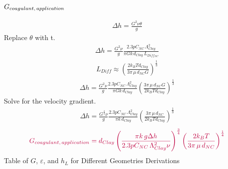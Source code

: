 \documentclass[letterpaper,10pt,english]{sphinxmanual}
\begin{document}
\subsubsection{\protect\(G_{coagulant, \, application}\protect\)}
\label{\detokenize{Rapid_Mix/RM_Derivations:id1}}\begin{equation}\label{equation:Rapid_Mix/RM_Derivations:Rapid_Mix/RM_Derivations:14}
\begin{split}\Delta h =   \frac{G^2 \nu \theta}{g}\end{split}
\end{equation}
Replace \(\theta\) with t.
\begin{equation}\label{equation:Rapid_Mix/RM_Derivations:Rapid_Mix/RM_Derivations:15}
\begin{split}\Delta h =  \frac{G^2 \nu}{g} \frac{2.3p C_{NC} \, \Lambda_{Clay}^2}{\pi G k \, d_{Clay}\,  L_{Diff_{NC}} }\end{split}
\end{equation}\begin{equation}\label{equation:Rapid_Mix/RM_Derivations:Rapid_Mix/RM_Derivations:16}
\begin{split}L_{Diff} \approx \left( \frac{2k_B T d_{Clay}}{3 \pi \,\mu  \, d_{NC} G}\right)^\frac{1}{3}\end{split}
\end{equation}\begin{equation}\label{equation:Rapid_Mix/RM_Derivations:Rapid_Mix/RM_Derivations:17}
\begin{split}\Delta h =  \frac{G^2 \nu}{g} \frac{2.3p C_{NC} \, \Lambda_{Clay}^2}{\pi G k \, d_{Clay}} \left( \frac{3 \pi \,\mu  \, d_{NC} G}{2k_B T d_{Clay}}\right)^\frac{1}{3}\end{split}
\end{equation}
Solve for the velocity gradient.
\begin{equation}\label{equation:Rapid_Mix/RM_Derivations:Rapid_Mix/RM_Derivations:18}
\begin{split}\Delta h =  \frac{G^\frac{4}{3} \nu}{g} \frac{2.3p C_{NC} \, \Lambda_{Clay}^2}{\pi k \, d_{Clay}} \left( \frac{3 \pi \,\mu  \, d_{NC} }{2k_B T d_{Clay}}\right)^\frac{1}{3}\end{split}
\end{equation}\begin{equation}\label{equation:Rapid_Mix/RM_Derivations:Rapid_Mix/RM_Derivations:19}
\begin{split}\color{purple}{
  G_{coagulant, \, application} =  d_{Clay}\left(\frac{\pi k \,g\Delta h }{2.3p C_{NC} \, \Lambda_{Clay}^2 \nu} \right)^\frac{3}{4} \left( \frac{2k_B T }{3 \pi \,\mu  \, d_{NC} }\right)^\frac{1}{4}
}\end{split}
\end{equation}
Table of \(G\), \(\varepsilon\), and \(h_L\) for Different Geometries Derivations
\end{document}
